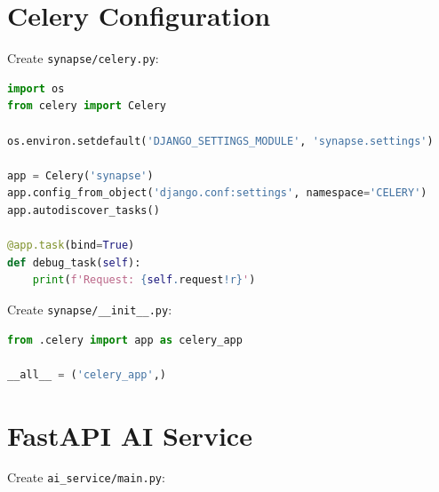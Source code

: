 \documentclass{report}
\begin{document}
\section{Celery Configuration}

Create \texttt{synapse/celery.py}:

\begin{lstlisting}[language=python, caption=Celery configuration]
import os
from celery import Celery

os.environ.setdefault('DJANGO_SETTINGS_MODULE', 'synapse.settings')

app = Celery('synapse')
app.config_from_object('django.conf:settings', namespace='CELERY')
app.autodiscover_tasks()

@app.task(bind=True)
def debug_task(self):
    print(f'Request: {self.request!r}')
\end{lstlisting}

Create \texttt{synapse/\_\_init\_\_.py}:

\begin{lstlisting}[language=python, caption=Celery initialization in Django]
from .celery import app as celery_app

__all__ = ('celery_app',)
\end{lstlisting}

\section{FastAPI AI Service}

Create \texttt{ai\_service/main.py}:
\end{document}
